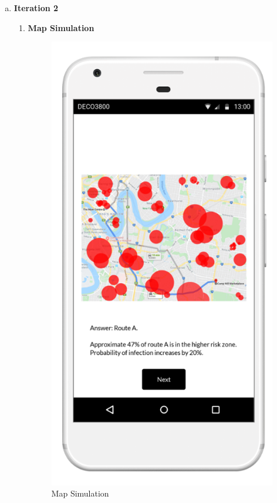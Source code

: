       \begin{enumerate}[a)]
        \item \textbf{Iteration 2}
        \begin{enumerate}[label=(\roman*)]
          \item \textbf{Map Simulation}
            \begin{figure}[H]
              \centering
              \includegraphics[scale=1]{img/digital-prototype/map-simulation.png}
              \caption{Map Simulation}
              \label{fig:digi-proto-01}

\end{figure}
\end{enumerate}
\end{enumerate}
